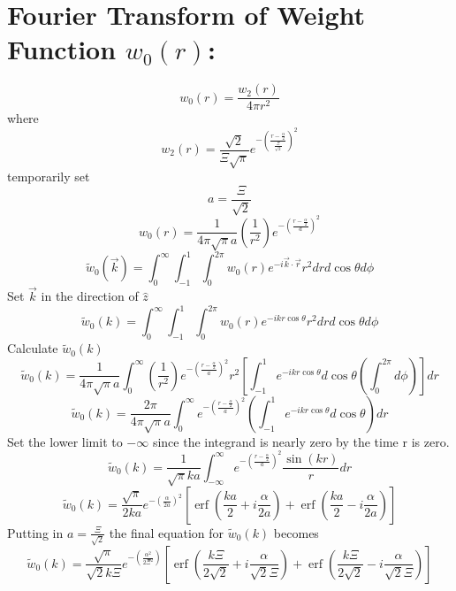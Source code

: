 \documentclass[double,12pt]{beavtex}
\begin{document}
\section{Fourier Transform of Weight Function $w_0(r)$:}
\begin{equation}{w_0(r)=\frac{w_2(r)}{4{\pi}r^2}}\end{equation}
where
\begin{equation}{w_2(r)=\frac{\sqrt{2}}{\Xi\sqrt{\pi}}e^{-\left(\frac{r-\frac{\alpha}{2}}{\frac{\Xi}{\sqrt{2}}}\right)^2}}\end{equation}
temporarily set 
\begin{equation}{a=\frac{\Xi}{\sqrt{2}}}\end{equation}
\begin{equation}{w_0(r)=\frac{1}{4{\pi}\sqrt{\pi}a}\left(\frac{1}{r^2}\right)e^{-\left(\frac{r-\frac{\alpha}{2}}{a}\right)^2}}\end{equation}
\begin{equation}{\widetilde{w}_0(\vec{k})=\int_{0}^{\infty}\int_{-1}^{1}\int_{0}^{2\pi}w_0(r)e^{-i\vec{k}\cdot{\vec{r}}}r^2d{r}d{\cos\theta}d{\phi}}\end{equation}
Set $\vec{k}$ in the direction of $\hat{z}$ 
\begin{equation}{\widetilde{w}_0(k)=\int_{0}^{\infty}\int_{-1}^{1}\int_{0}^{2\pi}w_0(r)e^{-ikr\cos\theta}r^2d{r}d{\cos\theta}d{\phi}}\end{equation}
\[{}\]
Calculate $\widetilde{w}_0(k)$ 
\begin{equation}{\widetilde{w}_0(k)=\frac{1}{4{\pi}\sqrt{\pi}a}\int_{0}^{\infty}\left(\frac{1}{r^2}\right)e^{-\left(\frac{r-\frac{\alpha}{2}}{a}\right)^2}r^2\left[\int_{-1}^{1}e^{-ikr\cos\theta}d{\cos\theta}\left(\int_{0}^{2\pi}d{\phi}\right)\right]d{r}}\end{equation}
\[{}\]
\begin{equation}{\widetilde{w}_0(k)=\frac{2\pi}{4{\pi}\sqrt{\pi}a}\int_{0}^{\infty}e^{-\left(\frac{r-\frac{\alpha}{2}}{a}\right)^2}\left(\int_{-1}^{1}e^{-ikr\cos\theta}d{\cos\theta}\right)d{r}}\end{equation}
\[{}\]
Set the lower limit to $-\infty$  since the integrand is nearly zero by the time r is zero. 
\begin{equation}{\widetilde{w}_0(k)=\frac{1}{\sqrt{\pi}ka}\int_{-\infty}^{\infty}e^{-\left(\frac{r-\frac{\alpha}{2}}{a}\right)^2}\frac{\sin(kr)}{r}d{r}}\end{equation}
\[{}\]
\begin{equation}{\widetilde{w}_0(k)=\frac{\sqrt{\pi}}{2ka}e^{-\left(\frac{\alpha}{2a}\right)^2}\left[\operatorname{erf}\left(\frac{ka}{2}+i\frac{\alpha}{2a}\right)+\operatorname{erf}\left(\frac{ka}{2}-i\frac{\alpha}{2a}\right)\right]}\end{equation}
\[{}\] 
Putting in $a=\frac{\Xi}{\sqrt{2}}$ the final equation for $\widetilde{w}_0(k)$ becomes
\begin{equation}{\widetilde{w}_0(k)=\frac{\sqrt{\pi}}{\sqrt{2}k\Xi}e^{-\left(\frac{\alpha^2}{2\Xi^2}\right)}\left[\operatorname{erf}\left(\frac{k\Xi}{2\sqrt{2}}+i\frac{\alpha}{\sqrt{2}\Xi}\right)+\operatorname{erf}\left(\frac{k\Xi}{2\sqrt{2}}-i\frac{\alpha}{\sqrt{2}\Xi}\right)\right]}\end{equation}
\end{document}
